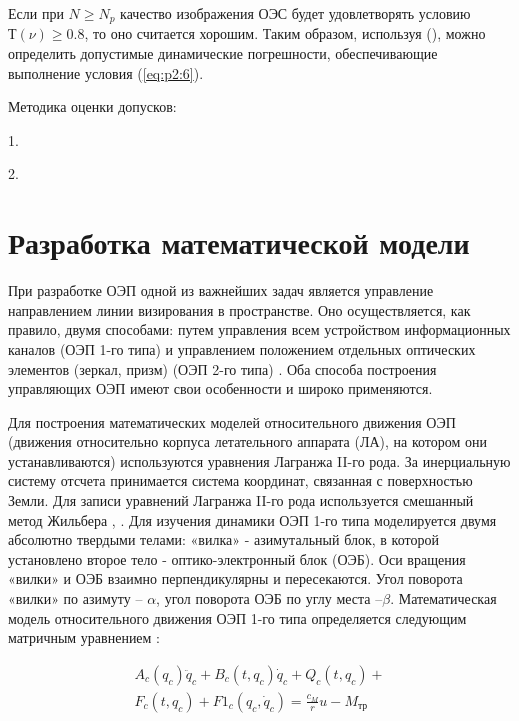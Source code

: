 Если при $N \ge N_p$ качество изображения ОЭС будет удовлетворять условию $Т(\nu) \ge 0.8$, то оно считается хорошим. Таким образом, используя (), можно определить допустимые динамические погрешности, обеспечивающие выполнение условия (\ref{eq:p2:6}).

Методика оценки допусков:

1.

2.


\section{Разработка математической модели} \label{sec:ch2/sec3}

При разработке ОЭП одной из важнейших задач является управление направлением линии визирования в пространстве. Оно осуществляется, как правило, двумя способами: путем управления всем устройством информационных каналов (ОЭП 1-го типа) и управлением положением отдельных оптических элементов (зеркал, призм) (ОЭП 2-го типа) \cite[]{Karpov23}. Оба способа построения управляющих ОЭП имеют свои особенности и широко применяются.

Для построения математических моделей относительного движения ОЭП (движения относительно корпуса летательного аппарата (ЛА), на котором они устанавливаются) используются уравнения Лагранжа II-го рода. За инерциальную систему отсчета принимается система координат, связанная с поверхностью Земли. Для записи уравнений Лагранжа II-го рода используется смешанный метод Жильбера \cite[]{Belyakov}, \cite[]{Baloev16}. Для изучения динамики ОЭП 1-го типа моделируется двумя абсолютно твердыми телами: «вилка» - азимутальный блок, в которой установлено второе тело - оптико-электронный блок (ОЭБ). Оси вращения «вилки» и ОЭБ взаимно перпендикулярны и пересекаются. Угол поворота «вилки» по азимуту – $\alpha$, угол поворота ОЭБ по углу места –$\beta$. Математическая модель относительного движения ОЭП 1-го типа определяется следующим матричным уравнением \cite[]{Karpov23}:

\begin{equation}
\label{eq:p2:6-}
\begin{alignedat}{2}
A_c\left(q_c\right){\ddot{q}}_c+B_c\left(t,q_c\right){\dot{q}}_c+Q_c\left(t,q_c\right)+\\
F_c\left(t,q_c\right)+F1_c\left(q_c,{\dot{q}}_c\right)=\frac{c_M}{r}u-M_{\textit{тр}}
\end{alignedat}
\end{equation}

